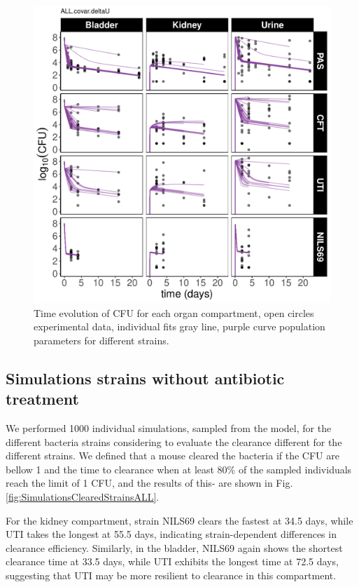 \documentclass{article}
\begin{document}
\begin{figure}
	\centering
	\includegraphics[width=\linewidth]{images/plt_Ct_strain_ALL_covar_deltaU.pdf}
	\caption{Time evolution of CFU for each organ compartment, open circles experimental data, individual fits gray line, purple curve population parameters for different strains.}
	\label{fig:ModelStrainsIndFits}
\end{figure}


\subsection{Simulations strains without antibiotic treatment}

We performed 1000 individual simulations, sampled from the model, for the different bacteria strains considering to evaluate the clearance different for the different strains.
We defined that a mouse cleared the bacteria if the CFU are bellow 1 and the time to clearance when at least 80\% of the sampled individuals reach the limit of 1 CFU, and the results of this- are shown in Fig. \ref{fig:SimulationsClearedStrainsALL}.

For the kidney compartment, strain NILS69 clears the fastest at 34.5 days, while UTI takes the longest at 55.5 days, indicating strain-dependent differences in clearance efficiency. Similarly, in the bladder, NILS69 again shows the shortest clearance time at 33.5 days, while UTI exhibits the longest time at 72.5 days, suggesting that UTI may be more resilient to clearance in this compartment.
\end{document}
